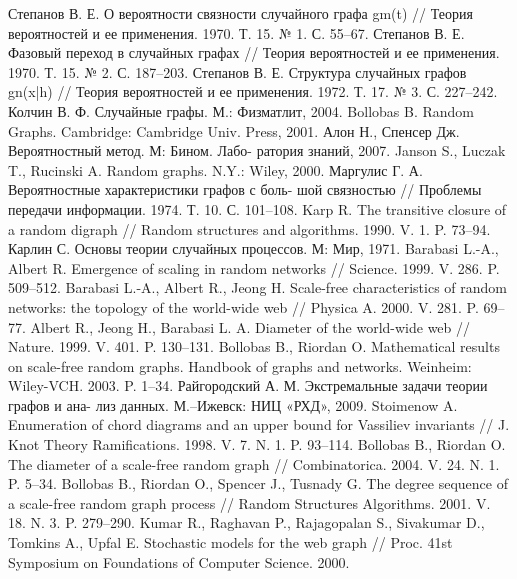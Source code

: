 \documentclass[14pt]{extreport}
\begin{document}

%
\begin{thebibliography}{9}

\bibitem{}
Степанов В. Е. О вероятности связности случайного графа
gm(t) // Теория вероятностей и ее применения. 1970. Т. 15. № 1.
С. 55–67.
\bibitem{}
Степанов В. Е. Фазовый переход в случайных графах // Теория
вероятностей и ее применения. 1970. Т. 15. № 2. С. 187–203.
\bibitem{}
Степанов В. Е. Структура случайных графов gn(x|h) // Теория
вероятностей и ее применения. 1972. Т. 17. № 3. С. 227–242.
\bibitem{}
Колчин В. Ф. Случайные графы. М.: Физматлит, 2004.
\bibitem{}
Bollobas B. Random Graphs. Cambridge: Cambridge Univ. Press,
2001.
\bibitem{}
Алон Н., Спенсер Дж. Вероятностный метод. М: Бином. Лабо-
ратория знаний, 2007.
\bibitem{}
Janson S., Luczak T., Rucinski A. Random graphs. N.Y.: Wiley,
2000.
\bibitem{}
Маргулис Г. А. Вероятностные характеристики графов с боль-
шой связностью // Проблемы передачи информации. 1974. Т. 10.
С. 101–108.
\bibitem{}
Karp R. The transitive closure of a random digraph // Random
structures and algorithms. 1990. V. 1. P. 73–94.
\bibitem{}
Карлин С. Основы теории случайных процессов. М: Мир, 1971.
\bibitem{}
Barabasi L.-A., Albert R. Emergence of scaling in random networks
// Science. 1999. V. 286. P. 509–512.
\bibitem{}
Barabasi L.-A., Albert R., Jeong H. Scale-free characteristics of
random networks: the topology of the world-wide web // Physica A.
2000. V. 281. P. 69–77.
\bibitem{}
Albert R., Jeong H., Barabasi L. A. Diameter of the world-wide web
// Nature. 1999. V. 401. P. 130–131.
\bibitem{}
Bollobas B., Riordan O. Mathematical results on scale-free random
graphs. Handbook of graphs and networks. Weinheim: Wiley-VCH.
2003. P. 1–34.
\bibitem{}
Райгородский А. М. Экстремальные задачи теории графов и ана-
лиз данных. М.–Ижевск: НИЦ «РХД», 2009.
\bibitem{}
Stoimenow A. Enumeration of chord diagrams and an upper bound
for Vassiliev invariants // J. Knot Theory Ramifications. 1998. V. 7.
N. 1. P. 93–114.
\bibitem{}
Bollobas B., Riordan O. The diameter of a scale-free random graph
// Combinatorica. 2004. V. 24. N. 1. P. 5–34.
\bibitem{}
Bollobas B., Riordan O., Spencer J., Tusnady G. The degree
sequence of a scale-free random graph process // Random Structures
Algorithms. 2001. V. 18. N. 3. P. 279–290.
\bibitem{}
Kumar R., Raghavan P., Rajagopalan S., Sivakumar D.,
Tomkins A., Upfal E. Stochastic models for the web graph //
Proc. 41st Symposium on Foundations of Computer Science. 2000.

\end{thebibliography}
\end{document}
